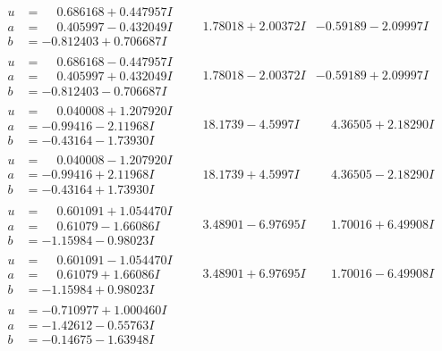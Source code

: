 \documentclass[1p]{elsarticle_modified}
\theoremstyle{definition}
\begin{document}
$$\begin{array}{c|c|c}
\begin{aligned}
u &= \phantom{-}0.686168 + 0.447957 I \\
a &= \phantom{-}0.405997 - 0.432049 I \\
b &= -0.812403 + 0.706687 I\end{aligned}
 & \phantom{-}1.78018 + 2.00372 I & -0.59189 - 2.09997 I \\ \hline\begin{aligned}
u &= \phantom{-}0.686168 - 0.447957 I \\
a &= \phantom{-}0.405997 + 0.432049 I \\
b &= -0.812403 - 0.706687 I\end{aligned}
 & \phantom{-}1.78018 - 2.00372 I & -0.59189 + 2.09997 I \\ \hline\begin{aligned}
u &= \phantom{-}0.040008 + 1.207920 I \\
a &= -0.99416 - 2.11968 I \\
b &= -0.43164 - 1.73930 I\end{aligned}
 & \phantom{-}18.1739 - 4.5997 I & \phantom{-}4.36505 + 2.18290 I \\ \hline\begin{aligned}
u &= \phantom{-}0.040008 - 1.207920 I \\
a &= -0.99416 + 2.11968 I \\
b &= -0.43164 + 1.73930 I\end{aligned}
 & \phantom{-}18.1739 + 4.5997 I & \phantom{-}4.36505 - 2.18290 I \\ \hline\begin{aligned}
u &= \phantom{-}0.601091 + 1.054470 I \\
a &= \phantom{-}0.61079 - 1.66086 I \\
b &= -1.15984 - 0.98023 I\end{aligned}
 & \phantom{-}3.48901 - 6.97695 I & \phantom{-}1.70016 + 6.49908 I \\ \hline\begin{aligned}
u &= \phantom{-}0.601091 - 1.054470 I \\
a &= \phantom{-}0.61079 + 1.66086 I \\
b &= -1.15984 + 0.98023 I\end{aligned}
 & \phantom{-}3.48901 + 6.97695 I & \phantom{-}1.70016 - 6.49908 I \\ \hline\begin{aligned}
u &= -0.710977 + 1.000460 I \\
a &= -1.42612 - 0.55763 I \\
b &= -0.14675 - 1.63948 I\end{aligned}

\end{array}$$
\end{document}
